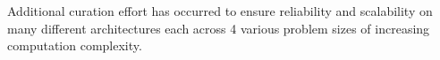 \documentclass[../document.tex]{subfiles}
\begin{document}
\label{sec:extending_the_opendwarfs_benchmark_suite}



Additional curation effort has occurred to ensure reliability and scalability on many different architectures each across 4 various problem sizes of increasing computation complexity.
\end{document}
